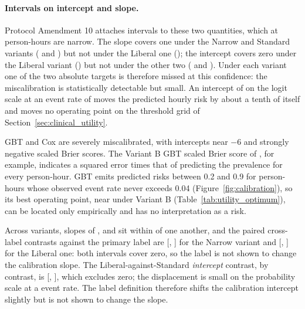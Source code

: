 \paragraph{Intervals on intercept and slope.} Protocol Amendment 10 attaches
intervals to these two quantities, which at \pcNTestRowsB{} person-hours are
narrow. The slope covers one under the
Narrow and Standard variants (\pcCalibSlopeCiA{} and \pcCalibSlopeCiB) but not
under the Liberal one (\pcCalibSlopeCiC); the intercept covers zero under the
Liberal variant (\pcCalibIntCiC) but not under the other two
(\pcCalibIntCiA{} and \pcCalibIntCiB). Under each variant one of the two
absolute targets is therefore missed at this confidence: the miscalibration is
statistically detectable but small. An intercept of \pcCalibIntPrimaryB{} on
the logit scale at an event rate of \pcPrevalenceB{} moves the predicted hourly
risk by about a tenth of itself and moves no operating point on the threshold
grid of Section~\ref{sec:clinical_utility}.

GBT and Cox are severely miscalibrated, with intercepts near $-6$ and strongly
negative scaled Brier scores. The Variant B GBT scaled Brier score of
\pcBrierScaledGbtB{}, for example, indicates a squared error
\pcBrierRatioGbtB{} times that of predicting the prevalence for every
person-hour. GBT emits predicted risks between 0.2 and 0.9 for person-hours
whose observed event rate never exceeds 0.04 (Figure~\ref{fig:calibration}),
so its best operating point, near \pcUtilityOptThresholdGbtB{} under Variant B
(Table~\ref{tab:utility_optimum}), can be located only empirically and has no
interpretation as a risk.

Across variants, slopes of \pcCalibSlopePrimaryA, \pcCalibSlopePrimaryB{} and
\pcCalibSlopePrimaryC{} sit within \pcCalibSlopeSpread{} of one another, and
the paired cross-label contrasts against the primary label are
\pcCalibDeltaSlopeAB{} [\pcCalibDeltaSlopeCiLoAB, \pcCalibDeltaSlopeCiHiAB]
for the Narrow variant and \pcCalibDeltaSlopeCB{}
[\pcCalibDeltaSlopeCiLoCB, \pcCalibDeltaSlopeCiHiCB] for the Liberal one:
both intervals cover zero, so the label is not shown to change the calibration
slope. The Liberal-against-Standard \emph{intercept} contrast, by contrast, is
\pcCalibDeltaIntCB{} [\pcCalibDeltaIntCiLoCB, \pcCalibDeltaIntCiHiCB], which
excludes zero; the displacement is small on the probability scale at a
\pcPrevalenceB{} event rate. The label definition therefore shifts the
calibration intercept slightly but is not shown to change the slope.

